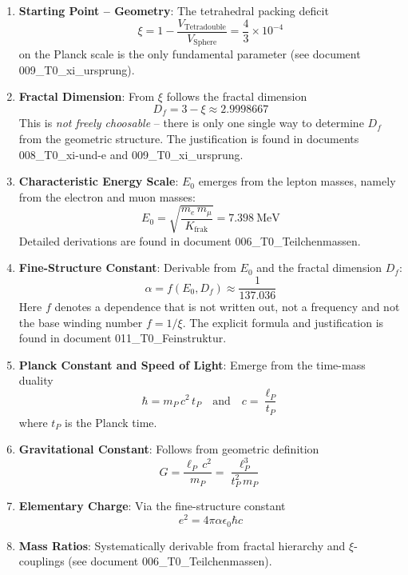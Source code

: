 	\begin{enumerate}
		\item \textbf{Starting Point -- Geometry}: The tetrahedral packing deficit
		\[
		\xi = 1 - \frac{V_{\text{Tetradouble}}}{V_{\text{Sphere}}} = \frac{4}{3} \times 10^{-4}
		\]
		on the Planck scale is the only fundamental parameter (see document 009\_T0\_xi\_ursprung).
		
		\item \textbf{Fractal Dimension}: From $\xi$ follows the fractal dimension
		\[
		D_f = 3 - \xi \approx 2.9998667
		\]
		This is \emph{not freely choosable} -- there is only one single way to determine $D_f$ from the geometric structure. The justification is found in documents 008\_T0\_xi-und-e and 009\_T0\_xi\_ursprung.
		
		\item \textbf{Characteristic Energy Scale}: $E_0$ emerges from the lepton masses, namely from the electron and muon masses:
		\[
		E_0 = \sqrt{\frac{m_e\, m_\mu}{K_{\text{frak}}}} = 7.398\ \text{MeV}
		\]
		Detailed derivations are found in document 006\_T0\_Teilchenmassen.
		
		\item \textbf{Fine-Structure Constant}: Derivable from $E_0$ and the fractal dimension $D_f$:
		\[
		\alpha = f(E_0, D_f) \approx \frac{1}{137.036}
		\]
		Here $f$ denotes a dependence that is not written out, not a frequency and not the base winding number $f = 1/\xi$. The explicit formula and justification is found in document 011\_T0\_Feinstruktur.
		
		\item \textbf{Planck Constant and Speed of Light}: Emerge from the time-mass duality
		\[
		\hbar = m_P \, c^2 \, t_P \quad \text{and} \quad c = \frac{\ell_P}{t_P}
		\]
		where $t_P$ is the Planck time.
		
		\item \textbf{Gravitational Constant}: Follows from geometric definition
		\[
		G = \frac{\ell_P \, c^2}{m_P} = \frac{\ell_P^3}{t_P^2 \, m_P}
		\]
		
		\item \textbf{Elementary Charge}: Via the fine-structure constant
		\[
		e^2 = 4\pi \alpha \epsilon_0 \hbar c
		\]
		
		\item \textbf{Mass Ratios}: Systematically derivable from fractal hierarchy and $\xi$-couplings (see document 006\_T0\_Teilchenmassen).
	\end{enumerate}

